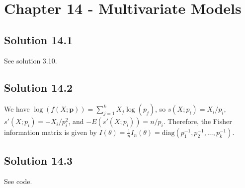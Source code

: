 \section*{Chapter 14 - Multivariate Models}

\subsection*{Solution 14.1}

See solution 3.10.


\subsection*{Solution 14.2}

We have $\log(f(X;\bm{p})) = \sum_{j = 1}^k X_j \log(p_j)$, so $s(X;p_i) = X_i/p_i$, $s'(X;p_i) = -X_i/p_i^2$, and $-E(s'(X;p_i)) = n/p_i$.
Therefore, the Fisher information matrix is given by $I(\theta) = \frac{1}{n} I_n(\theta) = \mathrm{diag}(p_1^{-1}, p_2^{-1}, ..., p_k^{-1})$.


\subsection*{Solution 14.3}

See code.
